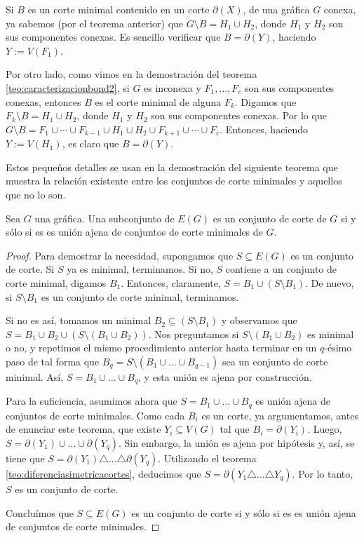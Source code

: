 Si $B$ es un corte minimal contenido en un corte $\partial(X)$, de una gráfica $G$ conexa, ya sabemos (por el teorema anterior) que $G\setminus B = H_{1}\cup H_{2}$, donde $H_{1}$ y $H_{2}$ son sus componentes conexas. Es sencillo verificar que $B = \partial(Y)$, haciendo $Y:=V(F_{1})$. 

Por otro lado, como vimos en la demostración del teorema \ref{teo:caracterizacionbond2}, si $G$ es inconexa y $F_{1}, \ldots, F_{c}$ son sus componentes conexas, entonces $B$ es el corte minimal de alguna $F_{k}$. Digamos que $F_{k}\setminus B = H_{1}\cup H_{2}$, donde $H_{1}$ y $H_{2}$ son sus componentes conexas. Por lo que $G\setminus B =F_{1}\cup \cdots \cup F_{k-1}\cup H_{1} \cup H_{2}\cup F_{k+1}\cup\cdots \cup F_{c}$. Entonces, haciendo $Y:=V(H_{1})$, es claro que $B = \partial(Y)$.

Estos pequeños detalles se usan en la demostración del siguiente teorema que muestra la relación existente entre los conjuntos de corte minimales y aquellos que no lo son. 

\begin{teo}\label{teo:unionajenademinimales}
Sea $G$ una gráfica. Una subconjunto de $E(G)$ es un conjunto de corte de $G$ si y sólo si es es unión ajena de conjuntos de corte minimales de $G$.
\end{teo}

\begin{proof}
Para demostrar la necesidad, supongamos que $S \subseteq E(G)$ es un conjunto de corte. Si $S$ ya es minimal, terminamos. Si no, $S$ contiene a un conjunto de corte minimal, digamos $B_{1}$. Entonces, claramente, $S=B_{1} \cup (S \setminus B_{1})$. De nuevo, si $S \setminus B_{1}$ es un conjunto de corte minimal, terminamos. 

Si no es así, tomamos un minimal $B_{2} \subseteq (S \setminus B_{1})$ y observamos que $S=B_{1} \cup B_{2} \cup (S \setminus (B_{1} \cup B_{2}))$. Nos preguntamos si $S \setminus (B_{1} \cup B_{2})$ es minimal o no, y repetimos el mismo procedimiento anterior hasta terminar en un $q$-ésimo paso de tal forma que $B_{q} = S \setminus (B_{1} \cup \ldots \cup B_{q-1})$ sea un conjunto de corte minimal. Así, $S=B_{1} \cup \ldots \cup B_{q}$, y esta unión es ajena por construcción.

Para la suficiencia, asumimos ahora que $S=B_{1} \cup \ldots \cup B_{q}$ es unión ajena de conjuntos de corte minimales. Como cada $B_{i}$ es un corte, ya argumentamos, antes de enunciar este teorema,  que existe $Y_{i} \subseteq V(G)$ tal que $B_{i} = \partial(Y_{i})$. Luego, $S = \partial(Y_{1}) \cup \ldots \cup \partial(Y_{q})$. Sin embargo, la unión es ajena por hipótesis y, así, se tiene que $S=\partial(Y_{1}) \triangle \ldots \triangle \partial(Y_{q})$. Utilizando el teorema \ref{teo:diferenciasimetricacortes}, deducimos que $S=\partial(Y_{1} \triangle \ldots \triangle Y_{q})$. Por lo tanto, $S$ es un conjunto de corte.

Concluímos que $S \subseteq E(G)$ es un conjunto de corte si y sólo si es es unión ajena de conjuntos de corte minimales.  

\end{proof}


